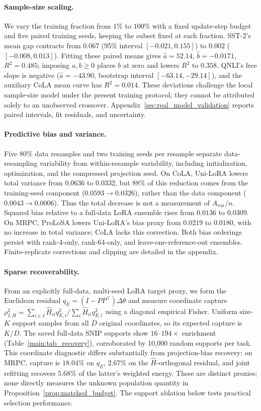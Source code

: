 \paragraph{Sample-size scaling.}
We vary the training fraction from $1\%$ to $100\%$ with a fixed update-step budget and five paired training seeds, keeping the subset fixed at each fraction. SST-2's mean gap contracts from $0.067$ (95\% interval $[-0.021,0.155]$) to $0.002$ ($[-0.008,0.013]$). Fitting these paired means gives $\hat a=52.14$, $\hat b=-0.0171$, $R^2=0.485$; imposing $a,b\geq0$ places $b$ at zero and lowers $R^2$ to $0.358$. QNLI's free slope is negative ($\hat a=-43.90$, bootstrap interval $[-63.14,-29.14]$), and the auxiliary CoLA mean curve has $R^2=0.014$. These deviations challenge the local sample-size model under the present training protocol; they cannot be attributed solely to an unobserved crossover. Appendix~\ref{sec:real_model_validation} reports paired intervals, fit residuals, and uncertainty.

\paragraph{Predictive bias and variance.}
Five 80\% data resamples and two training seeds per resample separate data-resampling variability from within-resample variability, including initialization, optimization, and the compressed projection seed. On CoLA, Uni-LoRA lowers total variance from $0.0636$ to $0.0332$, but $88\%$ of this reduction comes from the training-seed component ($0.0593\to0.0326$), rather than the data component ($0.0043\to0.0006$). Thus the total decrease is not a measurement of $A_{\mathrm{var}}/n$. Squared bias relative to a full-data LoRA ensemble rises from $0.0136$ to $0.0309$. On MRPC, ProLoSA lowers Uni-LoRA's bias proxy from $0.0219$ to $0.0180$, with no increase in total variance; CoLA lacks this correction. Both bias orderings persist with rank-4-only, rank-64-only, and leave-one-reference-out ensembles. Finite-replicate corrections and clipping are detailed in the appendix.

\paragraph{Sparse recoverability.}
From an explicitly full-data, multi-seed LoRA target proxy, we form the Euclidean residual $q_E=(I-PP^\top)\Delta\theta$ and measure coordinate capture $\rho_{I,H}^2=\sum_{i\in I}\hat H_{ii}q_{E,i}^2/\sum_i\hat H_{ii}q_{E,i}^2$ using a diagonal empirical Fisher. Uniform size-$K$ support samples from all $D$ original coordinates, so its expected capture is $K/D$. The saved full-data SNIP supports show $16$--$194\times$ enrichment (Table~\ref{main:tab_recovery}), corroborated by 10,000 random supports per task. This coordinate diagnostic differs substantially from projection-bias recovery: on MRPC, capture is $18.04\%$ on $q_E$, $2.67\%$ on the $\hat H$-orthogonal residual, and joint refitting recovers $5.68\%$ of the latter's weighted energy. These are distinct proxies; none directly measures the unknown population quantity in Proposition~\ref{prop:matched_budget}. The support ablation below tests practical selection performance.

